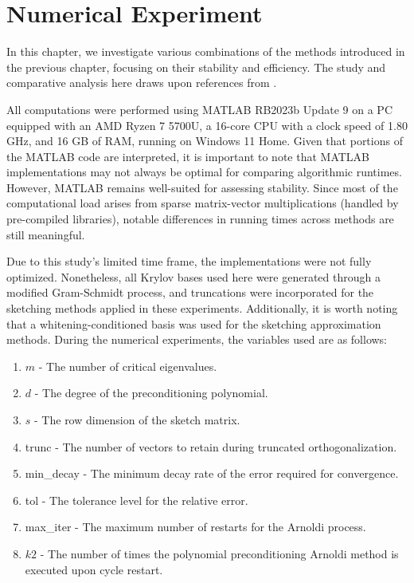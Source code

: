 \chapter{Numerical Experiment}
\label{sec:num_exper}


In this chapter, we investigate various combinations of the methods introduced in the previous chapter, focusing on their stability and efficiency. The study and comparative analysis here draws upon references from \cite{11, 52, 49, 41}.

All computations were performed using MATLAB RB2023b Update 9 on a PC equipped with an AMD Ryzen 7 5700U, a 16-core CPU with a clock speed of 1.80 GHz, and 16 GB of RAM, running on Windows 11 Home. Given that portions of the MATLAB code are interpreted, it is important to note that MATLAB implementations may not always be optimal for comparing algorithmic runtimes. However, MATLAB remains well-suited for assessing stability. Since most of the computational load arises from sparse matrix-vector multiplications (handled by pre-compiled libraries), notable differences in running times across methods are still meaningful.

Due to this study's limited time frame, the implementations were not fully optimized. Nonetheless, all Krylov bases used here were generated through a modified Gram-Schmidt process, and truncations were incorporated for the sketching methods applied in these experiments. Additionally, it is worth noting that a whitening-conditioned basis was used for the sketching approximation methods. During the numerical experiments, the variables used are as follows:
\begin{enumerate}
    \item $m$ - The number of critical eigenvalues.
    \item $d$ - The degree of the preconditioning polynomial.
    \item $s$ - The row dimension of the sketch matrix.
    \item trunc - The number of vectors to retain during truncated orthogonalization.
    \item min\_decay - The minimum decay rate of the error required for convergence.
    \item tol - The tolerance level for the relative error.
    \item max\_iter - The maximum number of restarts for the Arnoldi process.
    \item $k2$ - The number of times the polynomial preconditioning Arnoldi method is executed upon cycle restart.
\end{enumerate}

